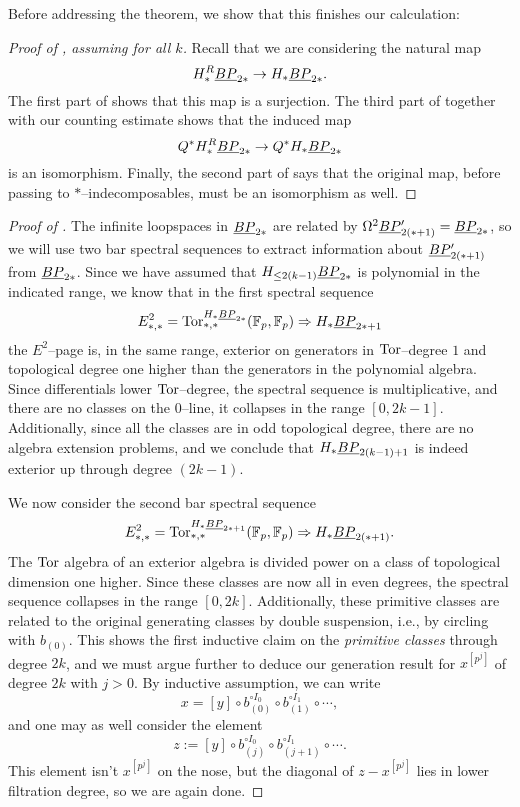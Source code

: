 \noindent Before addressing the theorem, we show that this finishes our calculation:
\begin{proof}[{Proof of , assuming  for all $k$}]
Recall that we are considering the natural map \[H_*^R \underline{\smash{BP}}_{2*} \to H_* \underline{\smash{BP}}_{2*}.\]  The first part of  shows that this map is a surjection.  The third part of  together with our counting estimate shows that the induced map \[Q^* H_*^R \underline{\smash{BP}}_{2*} \to Q^* H_* \underline{\smash{BP}}_{2*}\] is an isomorphism.  Finally, the second part of  says that the original map, before passing to $\ast$--indecomposables, must be an isomorphism as well.
\end{proof}

\begin{proof}[{Proof of }]
The infinite loopspaces in $\underline{\smash{BP}}_{2*}$ are related by $\Omega^2 \underline{\smash{BP}}_{2(*+1)}' = \underline{\smash{BP}}_{2*}$, so we will use two bar spectral sequences to extract information about $\underline{\smash{BP}}_{2(*+1)}'$ from $\underline{\smash{BP}}_{2*}$.  Since we have assumed that $H_{\le 2(k-1)} \underline{\smash{BP}}_{2*}$ is polynomial in the indicated range, we know that in the first spectral sequence \[E^2_{*, *} = \operatorname{Tor}^{H_* \underline{\smash{BP}}_{2*}}_{*, *}(\mathbb F_p, \mathbb F_p) \Rightarrow H_* \underline{\smash{BP}}_{2*+1}\] the $E^2$--page is, in the same range, exterior on generators in $\operatorname{Tor}$--degree $1$ and topological degree one higher than the generators in the polynomial algebra.  Since differentials lower $\operatorname{Tor}$--degree, the spectral sequence is multiplicative, and there are no classes on the $0$--line, it collapses in the range $[0, 2k-1]$.  Additionally, since all the classes are in odd topological degree, there are no algebra extension problems, and we conclude that $H_* \underline{\smash{BP}}_{2(k-1)+1}$ is indeed exterior up through degree $(2k-1)$.

We now consider the second bar spectral sequence \[E^2_{*, *} = \operatorname{Tor}^{H_* \underline{\smash{BP}}_{2*+1}}_{*, *}(\mathbb F_p, \mathbb F_p) \Rightarrow H_* \underline{\smash{BP}}_{2(*+1)}.\]  The $\operatorname{Tor}$ algebra of an exterior algebra is divided power on a class of topological dimension one higher.  Since these classes are now all in even degrees, the spectral sequence collapses in the range $[0, 2k]$.  Additionally, these primitive classes are related to the original generating classes by double suspension, i.e., by circling with $b_{(0)}$.  This shows the first inductive claim on the \emph{primitive classes} through degree $2k$, and we must argue further to deduce our generation result for $x^{[p^j]}$ of degree $2k$ with $j > 0$.  By inductive assumption, we can write \[x = [y] \circ b_{(0)}^{\circ I_0} \circ b_{(1)}^{\circ I_1} \circ \cdots,\] and one may as well consider the element \[z := [y] \circ b_{(j)}^{\circ I_0} \circ b_{(j+1)}^{\circ I_1} \circ \cdots.\]  This element isn't $x^{[p^j]}$ on the nose, but the diagonal of $z - x^{[p^j]}$ lies in lower filtration degree, so we are again done.


\end{proof}
